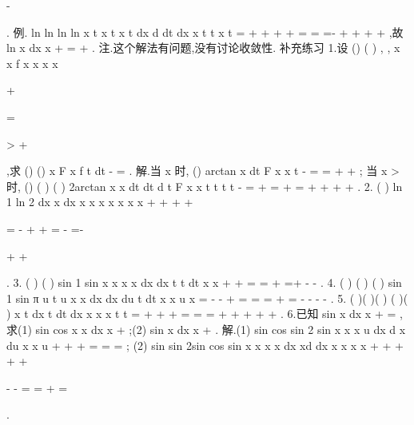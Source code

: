 -


. 
\textcolor{lyred}{例}.
ln
ln
ln
ln
x t
x
t
x
t
dx
d
dt
dx
x
t
t
x
t
=
+\infty 
+\infty 
+\infty 
+\infty 
=
=
=-
+
+
+
+
\int 
\int 
\int 
\int 
,故
ln
x dx
x
+\infty 
=
+
\int 
. 
\textcolor{lyred}{注}.这个解法有问题,没有讨论收敛性. 
\textcolor{lyred}{补充练习 }
1.设
()
(
)
,
,
x
x
f x
x
x
x

\le 
+

=

>
+

,求
()
()
x
F x
f t dt
-\infty 
=\int 
. 
解.当
x \le 
时,
()
arctan
x
dt
F x
x
t
\pi 
-\infty 
=
=
+
+
\int 
; 
当
x >
时,
()
(
)
(
)
2arctan
x
x
dt
dt
d t
F x
x
t
t
t
t
\pi 
\pi 
-\infty 
=
+
=
+
=
+
+
+
+
\int 
\int 
\int 
. 
2.
(
)
ln
1 ln 2
dx
x
dx
x
x
x
x
x
x
x
+\infty 
+\infty 
+\infty 
+




=
-
+
+
=
-
=-




+
+




\int 
\int 
. 
3.
(
)
(
)
sin
1 sin
x
x
x
x
dx
dx
t
t dt
x
x
\pi 
\pi 
+
+
=
=
+
=+
-
-
\int 
\int 
\int 
. 
4.
(
)
(
)
(
)
sin
1 sin
π
u
t
u
x
x
dx
dx
du
t
dt
x
x
u
x
\pi 
\pi 
=
-
-
+
=
=
=
+
=
-
-
-
-
\int 
\int 
\int 
\int 
. 
5.
(
)(
)(
)
(
)(
)
x t
dx
t dt
dx
x
x
x
t
t
\alpha 
\alpha 
\alpha 
\pi 
\alpha 
=
+\infty 
+\infty 
+\infty 
\ge 
=
=
=
+
+
+
+
+
\int 
\int 
\int 
. 
6.已知
sin
x dx
x
\pi 
+\infty 
=
\int 
,求(1)
sin cos
x
x dx
x
+\infty 
\int 
;(2)
sin x dx
x
+\infty 
\int 
. 
解.(1)
sin cos
sin 2
sin
x
x
x
u
dx
d x
du
x
x
u
\pi 
+\infty 
+\infty 
+\infty 
=
=
=
\int 
\int 
\int 
; 
(2)
sin
sin
2sin
cos
sin
x
x
x
x
dx
xd
dx
x
x
x
x
\pi 
+
+\infty 
+\infty 
+\infty 
+\infty 


-
-
=
=
+
=




\int 
\int 
\int 
. 